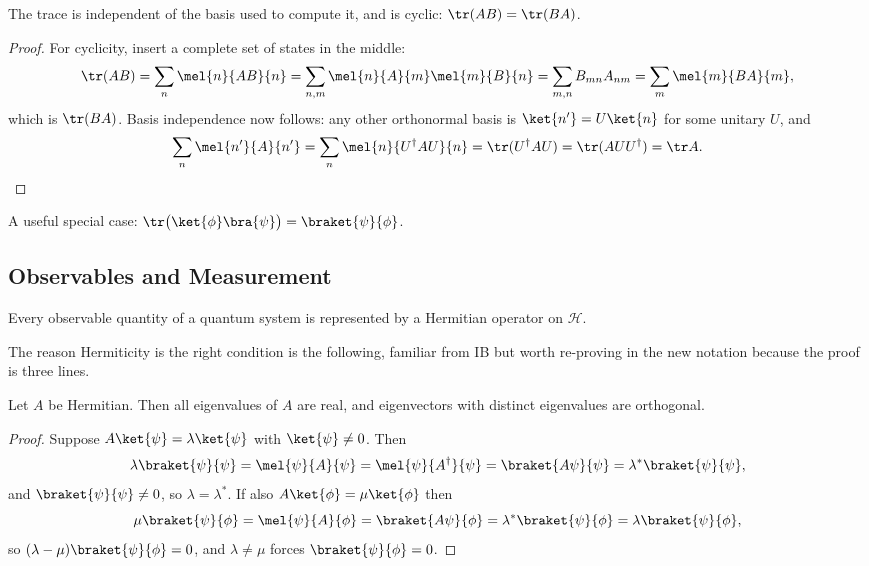 \begin{proposition}
    The trace is independent of the basis used to compute it, and is cyclic: $\tr(AB) = \tr(BA)$.
\end{proposition}
\begin{proof}
    For cyclicity, insert a complete set of states in the middle:
    $$
    \tr(AB) = \sum_n \mel{n}{AB}{n} = \sum_{n,m}\mel{n}{A}{m}\mel{m}{B}{n} = \sum_{m,n} B_{mn}A_{nm} = \sum_m \mel{m}{BA}{m},
    $$
    which is $\tr(BA)$.
    Basis independence now follows: any other orthonormal basis is $\ket{n'} = U\ket{n}$ for some unitary $U$, and
    $$
    \sum_n \mel{n'}{A}{n'} = \sum_n \mel{n}{U^\dagger A U}{n} = \tr(U^\dagger A U) = \tr(A U U^\dagger) = \tr A. \qedhere
    $$
\end{proof}

A useful special case: $\tr\big(\ket{\phi}\bra{\psi}\big) = \braket{\psi}{\phi}$.

\subsection{Observables and Measurement}

\begin{axiom}[Observables]
    Every observable quantity of a quantum system is represented by a Hermitian operator on $\mathcal{H}$.
\end{axiom}

The reason Hermiticity is the right condition is the following, familiar from IB but worth re-proving in the new notation because the proof is three lines.

\begin{proposition}
    Let $A$ be Hermitian. Then all eigenvalues of $A$ are real, and eigenvectors with distinct eigenvalues are orthogonal.
\end{proposition}
\begin{proof}
    Suppose $A\ket{\psi} = \lambda\ket{\psi}$ with $\ket{\psi} \neq 0$. Then
    $$
    \lambda \braket{\psi}{\psi} = \mel{\psi}{A}{\psi} = \mel{\psi}{A^\dagger}{\psi} = \braket{A\psi}{\psi} = \lambda^*\braket{\psi}{\psi},
    $$
    and $\braket{\psi}{\psi} \neq 0$, so $\lambda = \lambda^*$. If also $A\ket{\phi} = \mu\ket{\phi}$ then
    $$
    \mu \braket{\psi}{\phi} = \mel{\psi}{A}{\phi} = \braket{A \psi}{\phi} = \lambda^* \braket{\psi}{\phi} = \lambda \braket{\psi}{\phi},
    $$
    so $(\lambda - \mu)\braket{\psi}{\phi} = 0$, and $\lambda \neq \mu$ forces $\braket{\psi}{\phi} = 0$.
\end{proof}

